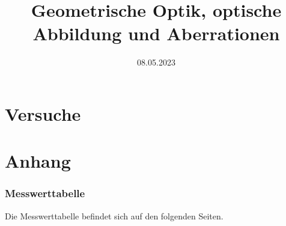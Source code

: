 
\usepackage{subfiles}

\title{Geometrische Optik, optische Abbildung und Aberrationen}
\date{08.05.2023}


\maketitle


\newpage

\newpage
\part{Versuche}

\newpage

\newpage

\newpage

\newpage
\part{Anhang}
\printbibliography[heading=bibnumbered,title=Referenzen und Literatur]
\newpage
\section{Messwerttabelle}
Die Messwerttabelle befindet sich auf den folgenden Seiten.

